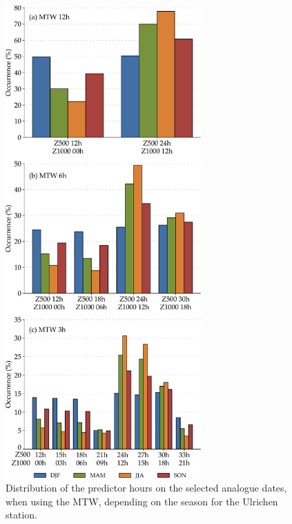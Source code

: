 \documentclass[hess, manuscript]{copernicus}
\begin{document}
	\begin{figure}[htb]
		\includegraphics[width=7.5cm]{fig11.pdf}
		\caption{Distribution of the predictor hours on the selected analogue dates, when using the MTW, depending on the season for the Ulrichen station.}
		\label{fig:hours_selection_per_season}
	\end{figure}
\end{document}
